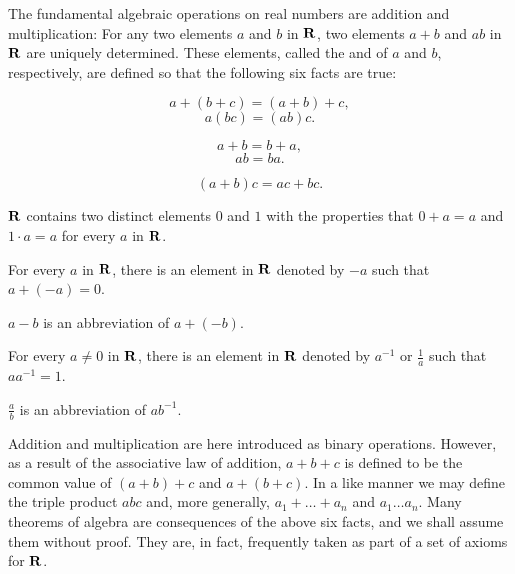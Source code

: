 The fundamental algebraic operations on real numbers
are addition and multiplication:
For any two elements $a$ and $b$ in $\mathrm{\bf R}$,
two elements $a + b$ and $ab$ in $\mathrm{\bf R}$ are uniquely determined.
These elements,
called the  and  of $a$ and $b$, respectively,
are defined so that the following six facts are true:


\begin{axiom}
\label{axiom.i}
\[
a + (b + c) = (a + b) + c,
\]
\[
a(bc) = (ab)c.
\]
\end{axiom}

\begin{axiom}
\label{axiom.ii}
\[
a + b = b + a,
\]
\[
ab= ba.
\]
\end{axiom}

\begin{axiom}
\label{axiom.iii}
\[
(a + b) c = ac + bc.
\]
\end{axiom}

\begin{axiom}
\label{axiom.iv}
$\mathrm{\bf R}$ contains two distinct elements $0$ and $1$
with the properties that $0 + a = a$ and $1 \cdot a = a$
for every $a$ in $\mathrm{\bf R}$.
\end{axiom}


\begin{axiom}
\label{axiom.v}
For every $a$ in $\mathrm{\bf R}$,
there is an element in $\mathrm{\bf R}$ denoted by $-a$
such that $a + (-a) = 0$.
\begin{note}
$a - b$ is an abbreviation of $a + (-b)$.
\end{note}
\end{axiom}


\begin{axiom}
\label{axiom.vi}
For every $a \neq 0$ in $\mathrm{\bf R}$,
there is an element in $\mathrm{\bf R}$ denoted by $a^{-1}$ or $\frac{1}{a}$
such that $aa^{-1} = 1$.
\begin{note}
$\frac{a}{b}$ is an abbreviation of $ab^{-1}$.
\end{note}
\end{axiom}

Addition and multiplication are here introduced as binary operations.
However, as a result of the associative law of addition,
$a + b + c$ is defined to be the
common value of $(a + b) + c$ and $a + (b + c)$.
In a like manner we may define the triple product $abc$ and,
more generally,
$a_{1} + \ldots + a_{n}$ and $a_{1} \ldots a_{n}$.
Many theorems of algebra are consequences of the above six facts,
and we shall assume them without proof.
They are, in fact,
frequently taken as part of a set of axioms for $\mathrm{\bf R}$.

